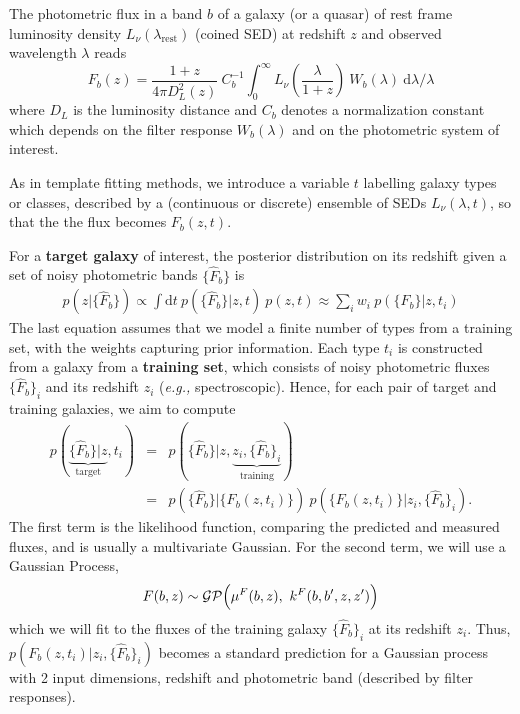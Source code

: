\documentclass[9pt, conference, a4paper]{IEEEtran}
\newcommand{\eg}{\textit{e.g.,}\xspace}
\newcommand{\equ}[1]{\begin{equation}#1\end{equation}}
\newcommand{\eqn}[1]{\begin{eqnarray}#1\end{eqnarray}}
\begin{document}
The photometric flux in a band $b$ of a galaxy (or a quasar) of rest frame luminosity density $L_\nu(\lambda_\mathrm{rest})$ (coined SED) at redshift $z$ and observed wavelength $\lambda$ reads
\equ{
	F_b(z) = \frac{1+z}{4\pi D_L^2(z)} \ C_b^{-1} \int_0^\infty L_\nu\left(\frac{\lambda}{1+z}\right) \ W_b(\lambda) \ \mathrm{d}\lambda/\lambda\label{fluxredshift} 
}
where $D_L$ is the luminosity distance and $C_b$ denotes a normalization constant which depends on the filter response $W_b(\lambda)$ and on the photometric system of interest.

As in template fitting methods, we introduce a variable $t$ labelling galaxy types or classes, described by a (continuous or discrete) ensemble of SEDs $L_\nu(\lambda, t)$, so that the the flux becomes $F_b(z, t)$.

For a {\bf target galaxy} of interest, the posterior distribution on its redshift given a set of noisy photometric bands $\{\hat{F}_b\}$ is
\eqn{
	p(z | \{\hat{F}_b\}) \propto \int \mathrm{d}t\  p(\{\hat{F}_b\} | z, t)\ p(z, t)
  \approx \sum_{i} w_i \ p(\{F_b\} | z, t_i)
  }
 The last equation assumes that we model a finite number of types from a training set, with the weights capturing prior information. Each type $t_i$ is constructed from a galaxy from a {\bf training set}, which consists of noisy photometric fluxes $\{\hat{F}_b\}_i$ and its redshift $z_i$ (\eg spectroscopic). Hence, for each pair of target and training galaxies, we aim to compute 
 \eqn{ 
 	p(\underbrace{\{\hat{F}_b\} | z}_{\mathrm{target}}, t_i ) &=& p(\{\hat{F}_b\} | z, \underbrace{z_i, \{\hat{F}_b\}_i}_{\mathrm{training}} ) \\
	&=& p\left(\{\hat{F}_b\} | \{F_b(z,t_i)\} \right) \ p\left( \{ F_b(z,t_i) \} | z_i, \{\hat{F}_b\}_i\right).\nonumber
	}
The first term is the likelihood function, comparing the predicted and measured fluxes, and is usually a multivariate Gaussian.
For the second term, we will use a Gaussian Process,
\equ{
	F(b, z) \sim \mathcal{GP}\Bigl( \mu^F(b, z), \ k^F(b, b', z, z')\Bigr)
}
which we will fit to the fluxes of the training galaxy $\{\hat{F}_b\}_i$ at its redshift $z_i$. Thus, $p\left( F_b(z,t_i) | z_i, \{\hat{F}_b\}_i\right)$ becomes a standard prediction for a Gaussian process with 2 input dimensions, redshift and photometric band (described by filter responses). 
\end{document}
